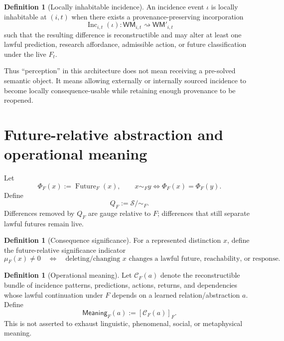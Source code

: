 \documentclass[10pt]{article}
\theoremstyle{venus}
\theoremstyle{definition}
\newtheorem{definition}[theorem]{Definition}
\newcommand{\Future}{\operatorname{Future}}
\newcommand{\Inc}{\operatorname{Inc}}
\newcommand{\WM}{\mathsf{WM}}
\begin{document}
\begin{definition}[Locally inhabitable incidence]
An incidence event $\iota$ is locally inhabitable at $(i,t)$ when there exists a
provenance-preserving incorporation
\[
\Inc_{i,t}(\iota):\WM_{i,t}\rightsquigarrow\WM'_{i,t}
\]
such that the resulting difference is reconstructible and may alter at least
one lawful prediction, research affordance, admissible action, or future
classification under the live $F_t$.
\end{definition}

Thus ``perception'' in this architecture does not mean receiving a pre-solved
semantic object. It means allowing externally or internally sourced incidence
to become locally consequence-usable while retaining enough provenance to be
reopened.

\section{Future-relative abstraction and operational meaning}

Let
\[
\Phi_F(x):=\Future_F(x),
\qquad
x\sim_F y\iff \Phi_F(x)=\Phi_F(y).
\]
Define
\begin{equation}\label{eq:quotient}
Q_F:=\mathcal S/\!\sim_F.
\end{equation}
Differences removed by $Q_F$ are gauge relative to $F$; differences that still
separate lawful futures remain live.

\begin{definition}[Consequence significance]
For a represented distinction $x$, define the future-relative significance
indicator
\begin{equation}\label{eq:mu}
\mu_F(x)\neq0
\quad\Longleftrightarrow\quad
\text{deleting/changing $x$ changes a lawful future, reachability, or response.}
\end{equation}
\end{definition}

\begin{definition}[Operational meaning]
Let $\mathcal C_F(a)$ denote the reconstructible bundle of incidence patterns,
predictions, actions, returns, and dependencies whose lawful continuation under
$F$ depends on a learned relation/abstraction $a$. Define
\begin{equation}\label{eq:meaning}
\mathsf{Meaning}_F(a):=[\mathcal C_F(a)]_F.
\end{equation}
This is not asserted to exhaust linguistic, phenomenal, social, or metaphysical
meaning.
\end{definition}
\end{document}
